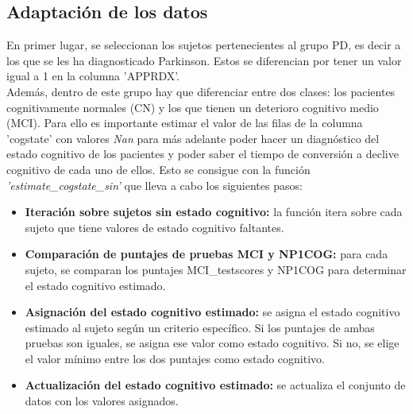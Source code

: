 \subsection{Adaptación de los datos}\label{sec:Adaptación de los datos}
En primer lugar, se seleccionan los sujetos pertenecientes al grupo PD, es decir a los que se les ha diagnosticado Parkinson. Estos se diferencian por tener un valor igual a 1 en la columna 'APPRDX'. \\

Además, dentro de este grupo hay que diferenciar entre dos clases: los pacientes cognitivamente normales (CN) y los que tienen un deterioro cognitivo medio (MCI). Para ello es importante estimar el valor de las filas de la columna 'cogstate' con valores \textit{Nan} para más adelante poder hacer un diagnóstico del estado cognitivo de los pacientes y poder saber el tiempo de conversión a declive cognitivo de cada uno de ellos. Esto se consigue con la función  \textit{'estimate\_cogstate\_sin'} que lleva a cabo los siguientes pasos:
\begin{itemize}
	\item \textbf{Iteración sobre sujetos sin estado cognitivo:} la función itera sobre cada sujeto que tiene valores de estado cognitivo faltantes.
	\item \textbf{Comparación de puntajes de pruebas MCI y NP1COG:} para cada sujeto, se comparan los puntajes MCI\_testscores y NP1COG para determinar el estado cognitivo estimado.
	\item\textbf{Asignación del estado cognitivo estimado:} se asigna el estado cognitivo estimado al sujeto según un criterio específico. Si los puntajes de ambas pruebas son iguales, se asigna ese valor como estado cognitivo. Si no, se elige el valor mínimo entre los dos puntajes como estado cognitivo.
	\item \textbf{Actualización del estado cognitivo estimado:} se actualiza el conjunto de datos con los valores asignados.
\end{itemize} 
